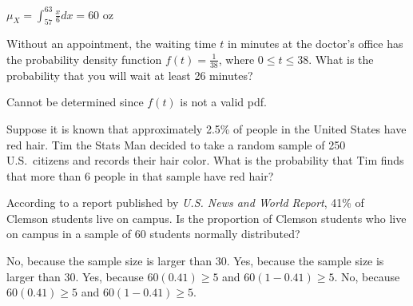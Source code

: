 \documentclass[noanswers]{exam}
\begin{document}
\begin{questions}
\begin{parts}
\begin{solution}[\stretch{1}]
$\mu_X=\int_{57}^{63}\frac{x}{6}dx=60$ oz

\vspace{3mm}
\end{solution}
\end{parts}

\newpage

\question Without an appointment, the waiting time $t$ in minutes at the doctor's office has the probability density function $f(t)=\frac{1}{38}$, where $0\leq t\leq 38$. What is the probability that you will wait at least 26 minutes?

\vspace{3mm}

\begin{choices}
\choice Cannot be determined since $f(t)$ is not a valid pdf.
\end{choices}

\vspace{3mm}

\question Suppose it is known that approximately 2.5\% of people in the United States have red hair. Tim the Stats Man decided to take a random sample of 250 U.S.\ citizens and records their hair color. What is the probability that Tim finds that more than 6 people in that sample have red hair?

\vspace{3mm}

\begin{choices}
\end{choices}

\vspace{3mm}

\question According to a report published by \textit{U.S. News and World Report}, 41\% of Clemson students live on campus. Is the proportion of Clemson students who live on campus in a sample of 60 students normally distributed?

\vspace{3mm}

\begin{choices}
\choice No, because the sample size is larger than 30.
\choice Yes, because the sample size is larger than 30.
\CorrectChoice Yes, because $60(0.41)\geq 5$ and $60(1-0.41)\geq5$.
\choice No, because $60(0.41)\geq 5$ and $60(1-0.41)\geq5$.
\end{choices}

\vspace{3mm}


\end{questions}
\end{document}
